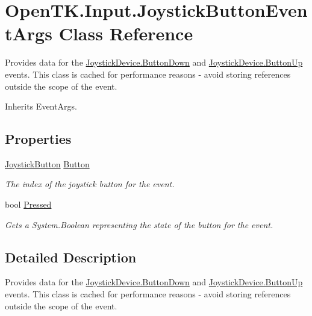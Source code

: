 \hypertarget{class_open_t_k_1_1_input_1_1_joystick_button_event_args}{\section{Open\-T\-K.\-Input.\-Joystick\-Button\-Event\-Args Class Reference}
\label{class_open_t_k_1_1_input_1_1_joystick_button_event_args}
}


Provides data for the \hyperlink{class_open_t_k_1_1_input_1_1_joystick_device_a677045ca3c8a2ac98095680bb5746ede}{Joystick\-Device.\-Button\-Down} and \hyperlink{class_open_t_k_1_1_input_1_1_joystick_device_a837891423d49811a2384c95f7576fbc2}{Joystick\-Device.\-Button\-Up} events. This class is cached for performance reasons -\/ avoid storing references outside the scope of the event.  




Inherits Event\-Args.

\subsection*{Properties}
\begin{DoxyCompactItemize}
\item 
\hyperlink{namespace_open_t_k_1_1_input_a54204a11d897164a26ceff29ee03f3d3}{Joystick\-Button} \hyperlink{class_open_t_k_1_1_input_1_1_joystick_button_event_args_a5984a4a8d487119f6e362661fc36c706}{Button}
\begin{DoxyCompactList}\small\item\em The index of the joystick button for the event. \end{DoxyCompactList}\item 
bool \hyperlink{class_open_t_k_1_1_input_1_1_joystick_button_event_args_a0bb2f495334c5e6e0f7a89e4354d6721}{Pressed}
\begin{DoxyCompactList}\small\item\em Gets a System.\-Boolean representing the state of the button for the event. \end{DoxyCompactList}\end{DoxyCompactItemize}


\subsection{Detailed Description}
Provides data for the \hyperlink{class_open_t_k_1_1_input_1_1_joystick_device_a677045ca3c8a2ac98095680bb5746ede}{Joystick\-Device.\-Button\-Down} and \hyperlink{class_open_t_k_1_1_input_1_1_joystick_device_a837891423d49811a2384c95f7576fbc2}{Joystick\-Device.\-Button\-Up} events. This class is cached for performance reasons -\/ avoid storing references outside the scope of the event. 



